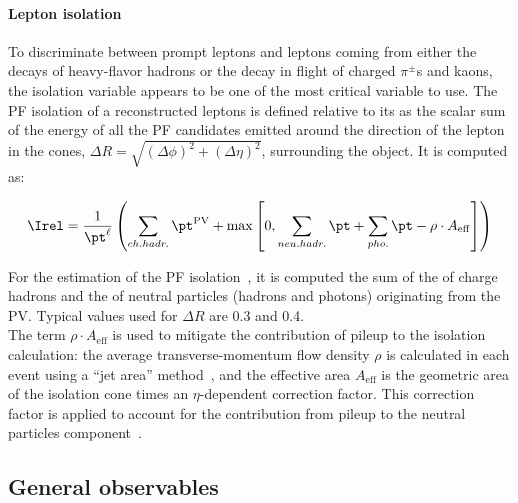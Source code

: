 \paragraph{Lepton isolation}\label{sec:c2iso}
To discriminate between prompt leptons and leptons coming from either the decays
of heavy-flavor hadrons or the decay in flight of charged $\pi^{\pm}$s and kaons, the isolation variable appears to be one of
the most critical variable to use. The PF isolation of a reconstructed
leptons is defined relative to its \pt as the scalar
sum of the energy of all the PF candidates emitted around the
direction of the lepton in the cones, $\Delta R = \sqrt{(\Delta
  \phi)^2+(\Delta \eta)^2}$, surrounding the object. It is computed as:
\begin{linenomath}
  \begin{equation}
    \label{eq:c2irel}
    \Irel = \frac{1}{\pt^\ell}
    \left(\sum_{ch.hadr.}\pt^{\mathrm{PV}} +
    \max{\left[0, \sum_{neu.hadr.}\pt + \sum_{pho.}\pt
        - \rho\cdot A_{\mathrm{eff}}\right]}\right)
  \end{equation}
\end{linenomath}
For the estimation of the PF isolation~\cite{CMS:particleflow}, it is computed the sum of the
\pt of charge hadrons and the \pt of neutral particles (hadrons
and photons) originating from the PV. Typical values used for  $\Delta
R$ are 0.3 and 0.4.\\
The term $\rho\cdot A_{\mathrm{eff}}$ is used to mitigate the
contribution of pileup to the isolation calculation: the average
transverse-momentum flow density $\rho$ is calculated in each event
using a ``jet area'' method~\cite{CACCIARI2008119}, and the effective
area $A_{\mathrm{eff}}$ is the geometric area of the isolation cone
times an $\eta$-dependent correction factor. This correction factor is applied to account for the contribution from pileup to the
neutral particles component~\cite{Sirunyan_2018_muon}.


\subsection*{General observables} \label{sec:c2observables}
